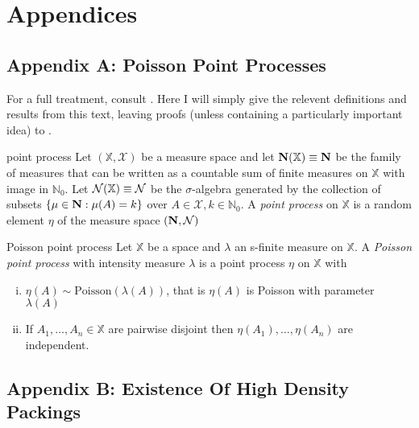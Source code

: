 \documentclass{article}
\begin{document}
\newpage

\section{Appendices}

\subsection{Appendix A: Poisson Point Processes}

For a full treatment, consult \cite{Last_Penrose_2017}. Here I will simply give the relevent definitions and 
results from this text, leaving proofs (unless containing a particularly important idea) to \cite{Last_Penrose_2017}.

\begin{definition}[]{point process}
    Let $(\mathbb{X}, \mathcal{X})$ be a measure space and let ${\bf N}(\mathbb{X}) \equiv {\bf N}$ be the family 
    of measures that can be written as a countable sum of finite measures on $\mathbb{X}$ with image in $\mathbb{N}_0$. 
    Let ${\bf \mathcal{N}}(\mathbb{X}) \equiv {\bf \mathcal{N}}$ be the $\sigma$-algebra generated by the collection 
    of subsets $\{\mu \in {\bf N} : \mu(A) = k\}$ over $A \in \mathcal{X}, k \in \mathbb{N}_0$. A {\it point process}
    on $\mathbb{X}$ is a random element $\eta$ of the measure space $({\bf N}, {\bf \mathcal{N}})$
\end{definition}

\begin{definition}[]{Poisson point process}
    Let $\mathbb{X}$ be a space and $\lambda$ an s-finite measure on $\mathbb{X}$. A {\it Poisson point process} 
    with intensity measure $\lambda$ is a point process $\eta$ on $\mathbb{X}$ with
    \begin{enumerate}[(i)]
        \item $\eta(A) \sim \text{Poisson}(\lambda(A))$, that is $\eta(A)$ is Poisson with parameter $\lambda(A)$
        \item If $A_1, \dots, A_n \in \mathbb{X}$ are pairwise disjoint then $\eta(A_1), \dots, \eta(A_n)$ 
        are independent.
    \end{enumerate}
\end{definition}

\newpage

\subsection{Appendix B: Existence Of High Density Packings}
\end{document}
